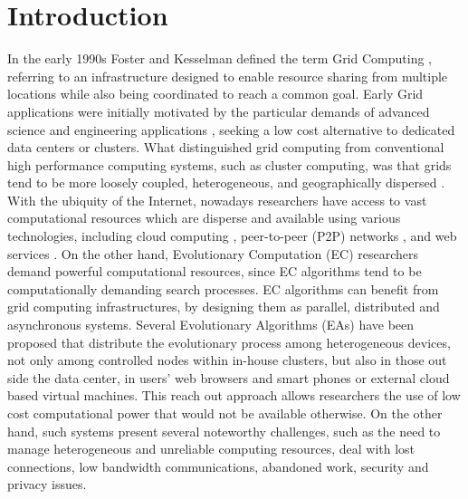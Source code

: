 \section{Introduction}
\label{sec:intro}

In the early 1990s Foster and Kesselman defined the term Grid Computing \cite{Foster:1998}, referring to an infrastructure designed to enable resource sharing from multiple locations while also being coordinated to reach a common goal. Early Grid applications were initially motivated by the particular demands of advanced science and engineering applications \cite{Baxevanidis:2002}, seeking a low cost alternative to dedicated data centers or clusters. What distinguished grid computing from conventional high performance computing systems, such as cluster computing, was that grids tend to be more loosely coupled, heterogeneous, and geographically dispersed \cite{Foster:1998}. With the ubiquity of the Internet, nowadays researchers have access to vast  computational resources which are disperse and available using various technologies, including cloud computing \cite{cloud,varia2008cloud}, peer-to-peer (P2P) networks  \cite{Oram:2001}, and web services \cite{Curbera:2002}. On the other hand, Evolutionary Computation (EC) researchers demand powerful computational resources, since EC algorithms tend to be computationally demanding search processes. EC algorithms can benefit from grid computing infrastructures, by designing them as parallel, distributed and asynchronous systems. Several Evolutionary Algorithms (EAs) have been proposed that distribute the evolutionary process among heterogeneous devices, not only among controlled nodes within in-house clusters, but also in those out side the data center, in users' web browsers and smart phones or external cloud based virtual machines. This reach out approach allows researchers the use of low cost computational power that would not be available otherwise.
On the other hand, such systems present several noteworthy challenges, such as the need to manage heterogeneous and unreliable computing resources, deal with lost connections, low bandwidth communications, abandoned work, security and privacy issues. 
 

